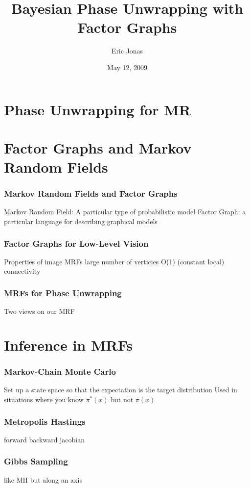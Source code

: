 \documentclass{beamer}
\title{Bayesian Phase Unwrapping with Factor Graphs}
\author{Eric Jonas}
\date{May 12, 2009}
\institute[6.556]{MIT Department of Brain and Cognitive Sciences}
\begin{document}
\begin{frame}
\maketitle
\end{frame}

\section{Phase Unwrapping for MR}


\section{Factor Graphs and Markov Random Fields}
\begin{frame}
\frametitle{Markov Random Fields and Factor Graphs}
Markov Random Field: A particular type of probabilistic model
Factor Graph: a particular language for describing graphical models
\cite{Kschischang01}

\end{frame}

\begin{frame} 
\frametitle{Factor Graphs for Low-Level Vision}
Properties of image MRFs
large number of verticies
O(1) (constant local) connectivity
\end{frame}

\begin{frame} 
\frametitle{MRFs for Phase Unwrapping}
Two views on our MRF
\end{frame}

\section{Inference in MRFs}

\begin{frame}
  \frametitle{Markov-Chain Monte Carlo}
  Set up a state space so that the expectation is the target distribution
  Used in situations where you know $\pi^\ast(x)$ but not $\pi(x)$

\end{frame}

\begin{frame}
  \frametitle{Metropolis Hastings}
  forward backward jacobian 
\end{frame}

\begin{frame}
  \frametitle{Gibbs Sampling}
  like MH but along an axis

\end{frame}
\end{document}
